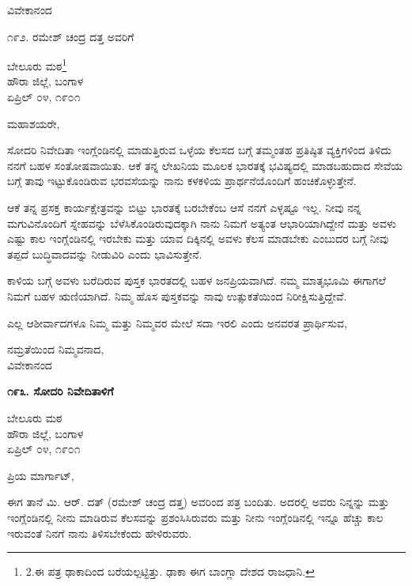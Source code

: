 \begin{flushright}
ವಿವೇಕಾನಂದ
\end{flushright}

೧೯೨. ರಮೇಶ್ ಚಂದ್ರ ದತ್ತ \textbf{} ಅವರಿಗೆ

\begin{flushright}
ಬೇಲೂರು ಮಠ\footnote{2.ಈ ಪತ್ರ ಢಾಕಾದಿಂದ ಬರೆಯಲ್ಪಟ್ಟಿತ್ತು. ಢಾಕಾ ಈಗ ಬಾಂಗ್ಲಾ ದೇಶದ ರಾಜಧಾನಿ.}\\ಹೌರಾ ಜಿಲ್ಲೆ, ಬಂಗಾಳ\\ಏಪ್ರಿಲ್ ೦೪, ೧೯೦೧
\end{flushright}

ಮಹಾಶಯರೇ,

ಸೋದರಿ ನಿವೇದಿತಾ ಇಂಗ್ಲೆಂಡಿನಲ್ಲಿ ಮಾಡುತ್ತಿರುವ ಒಳ್ಳೆಯ ಕೆಲಸದ ಬಗ್ಗೆ ತಮ್ಮಂತಹ ಪ್ರತಿಷ್ಠಿತ ವ್ಯಕ್ತಿಗಳಿಂದ ತಿಳಿದು ನನಗೆ ಬಹಳ ಸಂತೋಷವಾಯಿತು. ಆಕೆ ತನ್ನ ಲೇಖನಿಯ ಮೂಲಕ ಭಾರತಕ್ಕೆ ಭವಿಷ್ಯದಲ್ಲಿ ಮಾಡಬಹುದಾದ ಸೇವೆಯ ಬಗ್ಗೆ ತಾವು ಇಟ್ಟುಕೊಂಡಿರುವ ಭರವಸೆಯನ್ನು ನಾನು ಕಳಕಳಿಯ ಪ್ರಾರ್ಥನೆಯೊಂದಿಗೆ ಹಂಚಿಕೊಳ್ಳುತ್ತೇನೆ.

ಆಕೆ ತನ್ನ ಪ್ರಸಕ್ತ ಕಾರ್ಯಕ್ಷೇತ್ರವನ್ನು ಬಿಟ್ಟು ಭಾರತಕ್ಕೆ ಬರಬೇಕೆಂಬ ಆಸೆ ನನಗೆ ಎಳ್ಳಷ್ಟೂ ಇಲ್ಲ. ನೀವು ನನ್ನ ಮಗುವಿನೊಂದಿಗೆ ಸ್ನೇಹವನ್ನು ಬೆಳೆಸಿಕೊಂಡಿರುವುದಕ್ಕಾಗಿ ನಾನು ನಿಮಗೆ ಅತ್ಯಂತ ಆಭಾರಿಯಾಗಿದ್ದೇನೆ ಮತ್ತು ಅವಳು ಎಷ್ಟು ಕಾಲ ಇಂಗ್ಲೆಂಡಿ‌ನಲ್ಲಿ ಇರಬೇಕು ಮತ್ತು ಯಾವ ದಿಕ್ಕಿನಲ್ಲಿ ಅವಳು ಕೆಲಸ ಮಾಡಬೇಕು ಎಂಬುದರ ಬಗ್ಗೆ ನೀವು ತಪ್ಪದೆ ಬುದ್ಧಿವಾದವನ್ನು ನೀಡುವಿರಿ ಎಂದು ಭಾವಿಸುತ್ತೇನೆ.

ಕಾಳಿಯ ಬಗ್ಗೆ ಅವಳು ಬರೆದಿರುವ ಪುಸ್ತಕ ಭಾರತದಲ್ಲಿ ಬಹಳ ಜನಪ್ರಿಯವಾಗಿದೆ. ನಮ್ಮ ಮಾತೃಭೂಮಿ ಈಗಾಗಲೆ ನಿಮಗೆ ಬಹಳ ಋಣಿಯಾಗಿದೆ. ನಿಮ್ಮ ಹೊಸ ಪುಸ್ತಕವನ್ನು ನಾವು ಉತ್ಸುಕತೆಯಿಂದ ನಿರೀಕ್ಷಿಸುತ್ತಿದ್ದೇವೆ.

ಎಲ್ಲ ಆಶೀರ್ವಾದಗಳೂ ನಿಮ್ಮ ಮತ್ತು ನಿಮ್ಮವರ ಮೇಲೆ ಸದಾ ಇರಲಿ ಎಂದು ಅನವರತ ಪ್ರಾರ್ಥಿಸುವ,

\begin{flushright}
ನಮ್ರತೆಯಿಂದ ನಿಮ್ಮವನಾದ,\\ವಿವೇಕಾನಂದ
\end{flushright}

\begin{center}
\textbf{೧೯೩. ಸೋದರಿ ನಿವೇದಿತಾಳಿಗೆ}
\end{center}

\begin{flushright}
ಬೇಲೂರು ಮಠ\\ಹೌರಾ ಜಿಲ್ಲೆ, ಬಂಗಾಳ\\ಏಪ್ರಿಲ್ ೦೪, ೧೯೦೧
\end{flushright}

ಪ್ರಿಯ ಮಾರ್ಗಾಟ್,

ಈಗ ತಾನೆ ಮಿ. ಆರ್. ದತ್ (ರಮೇಶ್ ಚಂದ್ರ ದತ್ತ) ಅವರಿಂದ ಪತ್ರ ಬಂದಿತು. ಅದರಲ್ಲಿ ಅವರು ನಿನ್ನನ್ನು ಮತ್ತು ಇಂಗ್ಲೆಂಡಿನಲ್ಲಿ ನೀನು ಮಾಡಿರುವ ಕೆಲಸವನ್ನು ಪ್ರಶಂಸಿಸಿರುವರು ಮತ್ತು ನೀನು ಇಂಗ್ಲೆಂಡಿನಲ್ಲಿ ಇನ್ನೂ ಹೆಚ್ಚು ಕಾಲ ಇರುವಂತೆ ನಿನಗೆ ನಾನು ತಿಳಿಸಬೇಕೆಂದು ಹೇಳಿರುವರು.

